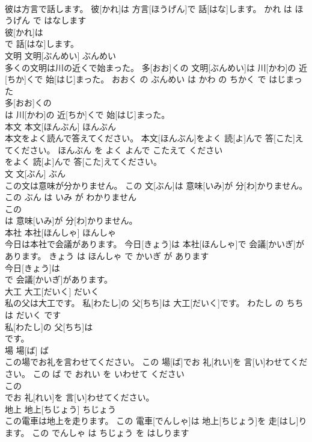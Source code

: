 \documentclass[8pt]{extreport}
\begin{document}
\begin{CJK}{UTF8}{min}
\\	彼は方言で話します。	彼[かれ]は 方言[ほうげん]で 話[はな]します。	かれ は ほうげん で はなします	
\\	彼[かれ]は
\\	で 話[はな]します。			
\\	文明	文明[ぶんめい]	ぶんめい	
\\	多くの文明は川の近くで始まった。	多[おお]くの 文明[ぶんめい]は 川[かわ]の 近[ちか]くで 始[はじ]まった。	おおく の ぶんめい は かわ の ちかく で はじまった	
\\	多[おお]くの
\\	は 川[かわ]の 近[ちか]くで 始[はじ]まった。			
\\	本文	本文[ほんぶん]	ほんぶん	
\\	本文をよく読んで答えてください。	本文[ほんぶん]をよく 読[よ]んで 答[こた]えてください。	ほんぶん を よく よんで こたえて ください	
\\	をよく 読[よ]んで 答[こた]えてください。			
\\	文	文[ぶん]	ぶん	
\\	この文は意味が分かりません。	この 文[ぶん]は 意味[いみ]が 分[わ]かりません。	この ぶん は いみ が わかりません	
\\	この
\\	は 意味[いみ]が 分[わ]かりません。			
\\	本社	本社[ほんしゃ]	ほんしゃ	
\\	今日は本社で会議があります。	今日[きょう]は 本社[ほんしゃ]で 会議[かいぎ]があります。	きょう は ほんしゃ で かいぎ が あります	
\\	今日[きょう]は
\\	で 会議[かいぎ]があります。			
\\	大工	大工[だいく]	だいく	
\\	私の父は大工です。	私[わたし]の 父[ちち]は 大工[だいく]です。	わたし の ちち は だいく です	
\\	私[わたし]の 父[ちち]は
\\	です。			
\\	場	場[ば]	ば	
\\	この場でお礼を言わせてください。	この 場[ば]でお 礼[れい]を 言[い]わせてください。	この ば で おれい を いわせて ください	
\\	この
\\	でお 礼[れい]を 言[い]わせてください。			
\\	地上	地上[ちじょう]	ちじょう	
\\	この電車は地上を走ります。	この 電車[でんしゃ]は 地上[ちじょう]を 走[はし]ります。	この でんしゃ は ちじょう を はしります	

\end{CJK}
\end{document}
